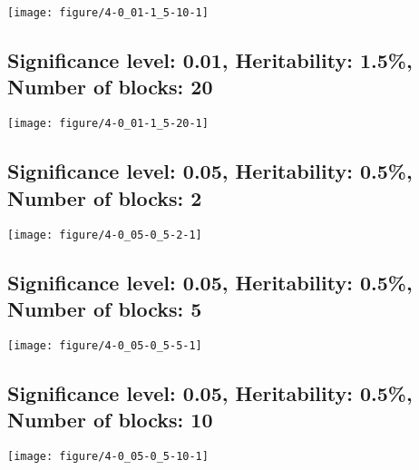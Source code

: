 \documentclass[11pt,letter]{article}\usepackage[]{graphicx}\usepackage[]{color}
\makeatletter
\def\maxwidth{ %
  \ifdim\Gin@nat@width>\linewidth
    \linewidth
  \else
    \Gin@nat@width
  \fi
}
\newenvironment{knitrout}{}{} %
\makeatother
\begin{document}
\begin{knitrout}
\color{fgcolor}
\texttt{[image: figure/4-0\_01-1\_5-10-1]} 

\end{knitrout}

\newpage
\subsection{Significance level: 0.01, Heritability: 1.5\%, Number of blocks: 20}

\begin{knitrout}
\color{fgcolor}
\texttt{[image: figure/4-0\_01-1\_5-20-1]} 

\end{knitrout}

\newpage
\subsection{Significance level: 0.05, Heritability: 0.5\%, Number of blocks: 2}

\begin{knitrout}
\color{fgcolor}
\texttt{[image: figure/4-0\_05-0\_5-2-1]} 

\end{knitrout}

\newpage
\subsection{Significance level: 0.05, Heritability: 0.5\%, Number of blocks: 5}

\begin{knitrout}
\color{fgcolor}
\texttt{[image: figure/4-0\_05-0\_5-5-1]} 

\end{knitrout}

\newpage
\subsection{Significance level: 0.05, Heritability: 0.5\%, Number of blocks: 10}

\begin{knitrout}
\color{fgcolor}
\texttt{[image: figure/4-0\_05-0\_5-10-1]} 

\end{knitrout}
\end{document}
